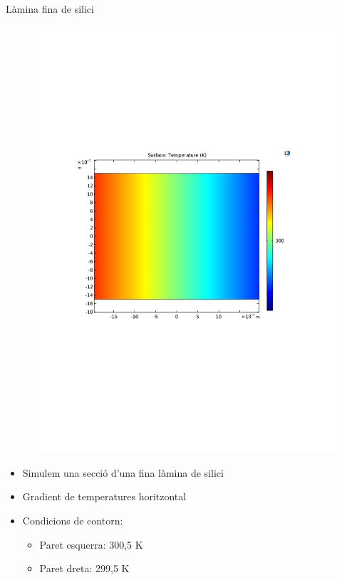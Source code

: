 \documentclass{beamer}
\begin{document}
\begin{frame}{L\`{a}mina fina de silici}
\vspace{-6mm}
\begin{figure}
\begin{center}
\includegraphics[scale=0.45]{../grafics/film/tf-temperatura.pdf}
\end{center}
\end{figure}
\vspace{-4mm}
\begin{itemize}
\item Simulem una secci\'{o} d'una fina l\`{a}mina de silici
\pause
\item Gradient de temperatures horitzontal
\pause
\item Condicions de contorn:
\begin{itemize}
\item Paret esquerra: 300,5 K
\pause
\item Paret dreta: 299,5 K
\end{itemize}
\end{itemize}
\end{frame}
\end{document}

